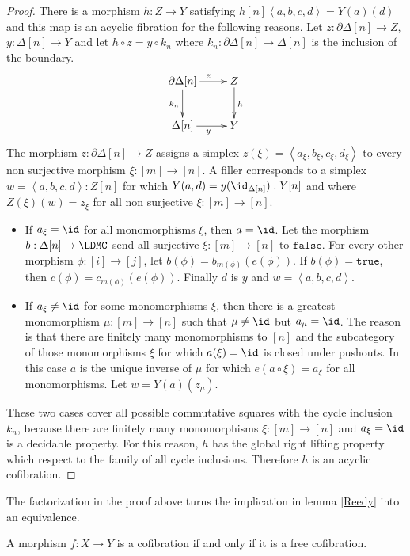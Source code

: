 \documentclass{tac}
\newcommand\of{:}
\newcommand\simplex\Delta
\newcommand\cycle{\partial\Delta}
\newcommand\tuplet[1]{\left\langle #1 \right\rangle}
\newcommand\true{\mathtt{true}}
\newcommand\false{\mathtt{false}}
\begin{document}
\begin{proof}
There is a morphism $h\of Z\to Y$ satisfying $h[n]\tuplet{a,b,c,d} = Y(a)(d)$ and this map is an acyclic fibration for the following reasons.
Let $z\of\cycle[n]\to Z$, $y\of\simplex[n]\to Y$ and let $h\circ z = y\circ k_n$ where $k_n\of\cycle[n]\to \simplex[n]$ is the inclusion of the boundary.
\[\xymatrix{
\cycle[n]\ar[d]_{k_n}\ar[r]^z & Z\ar[d]^h\\
\simplex[n]\ar[r]_{y} & Y
}\]
The morphism $z\of\cycle[n]\to Z$ assigns a simplex $z(\xi) = \tuplet{a_\xi,b_\xi,c_\xi,d_\xi}$ to every non surjective morphism $\xi\of [m]\to[n]$.
A filler corresponds to a simplex $w=\tuplet{a,b,c,d}\of Z[n]$ for which $Y(a,d) = y(\id_{\simplex[n]})\of Y[n]$ and where $Z(\xi)(w)=z_\xi$ for all non surjective $\xi\of [m]\to[n]$.
\begin{itemize}
\item If $a_\xi=\id$ for all monomorphisms $\xi$, then $a=\id$. Let the morphism $b\of \simplex[n]\to \LDMC$ send all surjective $\xi\of[m]\to[n]$ to $\false$. For every other morphism $\phi\of [i]\to [j]$, let $b(\phi) = b_{m(\phi)}(e(\phi))$. If $b(\phi)=\true$, then $c(\phi) = c_{m(\phi)}(e(\phi))$. Finally $d$ is $y$ and $w=\tuplet{a,b,c,d}$.
\item If $a_\xi\neq \id$ for some monomorphisms $\xi$, then there is a greatest monomorphism $\mu\of [m]\to[n]$ such that $\mu\neq \id$ but $a_\mu=\id$. The reason is that there are finitely many monomorphisms to $[n]$ and the subcategory of those monomorphisms $\xi$ for which $a(\xi)=\id$ is closed under pushouts. In this case $a$ is the unique inverse of $\mu$ for which $e(a\circ \xi) = a_\xi$ for all monomorphisms. Let $w = Y(a)(z_\mu)$.
\end{itemize}

These two cases cover all possible commutative squares with the cycle inclusion $k_n$, because there are finitely many monomorphisms $\xi\of [m]\to [n]$ and $a_\xi = \id$ is a decidable property. For this reason, $h$ has the global right lifting property which respect to the family of all cycle inclusions. Therefore $h$ is an acyclic cofibration.
\end{proof} %

The factorization in the proof above turns the implication in lemma \ref{Reedy} into an equivalence.

\begin{proposition} A morphism $f\of X\to Y$ is a cofibration if and only if it is a free cofibration. \label{cofibration characterization} \end{proposition}
\end{document}
